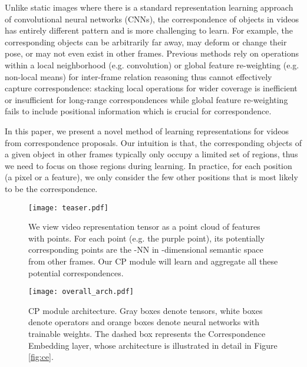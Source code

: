 \documentclass[10pt,twocolumn,letterpaper]{article}
\begin{document}
Unlike static images where there is a standard representation learning approach of convolutional neural networks (CNNs),  the correspondence of objects in videos has entirely different pattern and is more challenging to learn. For example, the corresponding objects can be arbitrarily far away, may deform or change their pose, or may not even exist in other frames. Previous methods rely on operations within a local neighborhood (e.g. convolution) or global feature re-weighting (e.g. non-local means) for inter-frame relation reasoning thus cannot effectively capture correspondence: stacking local operations for wider coverage is inefficient or insufficient for long-range correspondences while global feature re-weighting fails to include positional information which is crucial for correspondence.

In this paper, we present a novel method of learning representations for videos from  correspondence proposals. Our intuition is that, the corresponding objects of a given object in other frames typically only occupy a limited set of regions, thus we need to focus on those regions during learning. In practice, for each position (a pixel or a feature), we only consider the few other positions that is most likely to be the correspondence.

\begin{figure}[t]
\centering
\texttt{[image: teaser.pdf]}
\centering
\vspace{-2ex}
\caption{We view video representation tensor as a point cloud of features with  points. For each point (e.g. the purple point), its  potentially corresponding points are the -NN in -dimensional semantic space from other frames. Our CP module will learn and aggregate all these potential correspondences.}
\label{fig:teaser}
\vspace{-2ex}
\end{figure}


\begin{figure*}[t]
\centering
\texttt{[image: overall\_arch.pdf]}
\caption{CP module architecture. Gray boxes denote tensors, white boxes denote operators and orange boxes denote neural networks with trainable weights. The dashed box represents the Correspondence Embedding layer, whose  architecture is illustrated in detail in Figure \ref{fig:ce}.}
\label{fig:overall_arch}
\vspace{-2ex}
\end{figure*}
\end{document}
